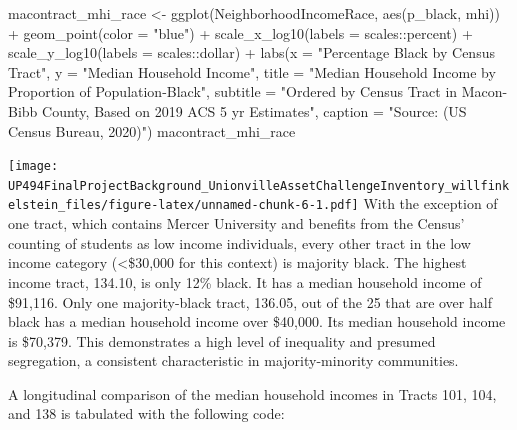 \documentclass[
]{article}
\newenvironment{Shaded}{\begin{snugshade}}{\end{snugshade}}
\newcommand{\AttributeTok}[1]{\textcolor[rgb]{0.77,0.63,0.00}{#1}}
\newcommand{\FunctionTok}[1]{\textcolor[rgb]{0.00,0.00,0.00}{#1}}
\newcommand{\NormalTok}[1]{#1}
\newcommand{\OtherTok}[1]{\textcolor[rgb]{0.56,0.35,0.01}{#1}}
\newcommand{\SpecialCharTok}[1]{\textcolor[rgb]{0.00,0.00,0.00}{#1}}
\newcommand{\StringTok}[1]{\textcolor[rgb]{0.31,0.60,0.02}{#1}}
\begin{document}
\begin{Shaded}
\begin{Highlighting}[]
\NormalTok{macontract\_mhi\_race }\OtherTok{\textless{}{-}} \FunctionTok{ggplot}\NormalTok{(NeighborhoodIncomeRace, }\FunctionTok{aes}\NormalTok{(p\_black, mhi)) }\SpecialCharTok{+} \FunctionTok{geom\_point}\NormalTok{(}\AttributeTok{color =} \StringTok{"blue"}\NormalTok{) }\SpecialCharTok{+} 
\FunctionTok{scale\_x\_log10}\NormalTok{(}\AttributeTok{labels =}\NormalTok{ scales}\SpecialCharTok{::}\NormalTok{percent) }\SpecialCharTok{+}
\FunctionTok{scale\_y\_log10}\NormalTok{(}\AttributeTok{labels =}\NormalTok{ scales}\SpecialCharTok{::}\NormalTok{dollar) }\SpecialCharTok{+} 
\FunctionTok{labs}\NormalTok{(}\AttributeTok{x =} \StringTok{"Percentage Black by Census Tract"}\NormalTok{, }\AttributeTok{y =} \StringTok{"Median Household Income"}\NormalTok{,}
     \AttributeTok{title =} \StringTok{"Median Household Income by Proportion of Population{-}Black"}\NormalTok{,}
     \AttributeTok{subtitle =}  \StringTok{"Ordered by Census Tract in Macon{-}Bibb County, Based on 2019 ACS 5 yr Estimates"}\NormalTok{,}
     \AttributeTok{caption =} \StringTok{"Source: (US Census Bureau, 2020)"}\NormalTok{)}
\NormalTok{macontract\_mhi\_race}
\end{Highlighting}
\end{Shaded}

\texttt{[image: UP494FinalProjectBackground\_UnionvilleAssetChallengeInventory\_willfinkelstein\_files/figure-latex/unnamed-chunk-6-1.pdf]}
With the exception of one tract, which contains Mercer University and
benefits from the Census' counting of students as low income
individuals, every other tract in the low income category
(\textless\$30,000 for this context) is majority black. The highest
income tract, 134.10, is only 12\% black. It has a median household
income of \$91,116. Only one majority-black tract, 136.05, out of the 25
that are over half black has a median household income over \$40,000.
Its median household income is \$70,379. This demonstrates a high level
of inequality and presumed segregation, a consistent characteristic in
majority-minority communities.

A longitudinal comparison of the median household incomes in Tracts 101,
104, and 138 is tabulated with the following code:
\end{document}
